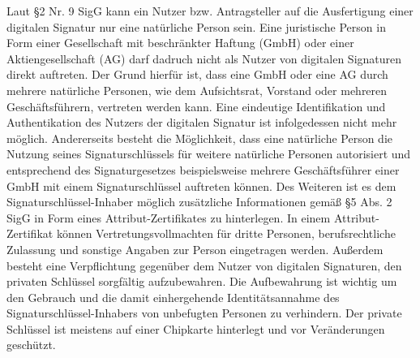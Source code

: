 Laut \S 2 Nr. 9 SigG kann ein Nutzer bzw. Antragsteller auf die Ausfertigung einer digitalen Signatur nur eine natürliche Person sein. Eine juristische Person in Form einer Gesellschaft mit beschränkter Haftung (GmbH) oder einer Aktiengesellschaft (AG) darf dadruch nicht als Nutzer von digitalen Signaturen direkt auftreten. Der Grund hierfür ist, dass eine GmbH oder eine AG durch mehrere natürliche Personen, wie dem Aufsichtsrat, Vorstand oder mehreren Geschäftsführern, vertreten werden kann. Eine eindeutige Identifikation und Authentikation des Nutzers der digitalen Signatur ist infolgedessen nicht mehr möglich. Andererseits besteht die Möglichkeit, dass eine natürliche Person die Nutzung seines Signaturschlüssels für weitere natürliche Personen autorisiert und entsprechend des Signaturgesetzes beispielsweise mehrere Geschäftsführer einer GmbH mit einem Signaturschlüssel auftreten können. Des Weiteren ist es dem Signaturschlüssel-Inhaber möglich zusätzliche Informationen gemäß \S 5 Abs. 2 SigG in Form eines Attribut-Zertifikates zu hinterlegen. In einem Attribut-Zertifikat können Vertretungsvollmachten für dritte Personen, berufsrechtliche Zulassung und sonstige Angaben zur Person eingetragen werden. Außerdem besteht eine Verpflichtung gegenüber dem Nutzer von digitalen Signaturen, den privaten Schlüssel sorgfältig aufzubewahren. Die Aufbewahrung ist wichtig um den Gebrauch und die damit einhergehende Identitätsannahme des Signaturschlüssel-Inhabers von unbefugten Personen zu verhindern. Der private Schlüssel ist meistens auf einer Chipkarte hinterlegt und vor Veränderungen geschützt. \cite{standdeswissens3}\cite{standdeswissens4}